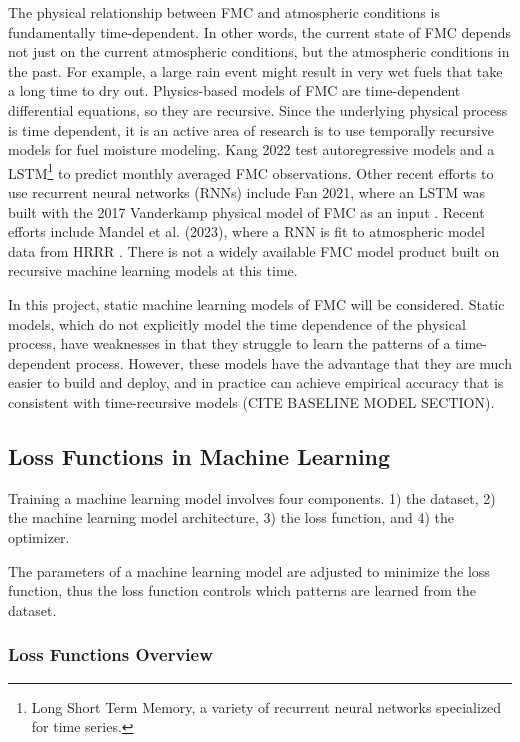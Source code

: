 \documentclass[11pt]{article}%
\begin{document}
The physical relationship between FMC and atmospheric conditions is fundamentally time-dependent. In other words, the current state of FMC depends not just on the current atmospheric conditions, but the atmospheric conditions in the past. For example, a large rain event might result in very wet fuels that take a long time to dry out. Physics-based models of FMC are time-dependent differential equations, so they are recursive. Since the underlying physical process is time dependent, it is an active area of research is to use temporally recursive models for fuel moisture modeling. Kang 2022 test autoregressive models and a LSTM\footnote{Long Short Term Memory, a variety of recurrent neural networks specialized for time series.} to predict monthly averaged FMC observations. \cite{Kang-2022-FMC} Other recent efforts to use recurrent neural networks (RNNs) include Fan 2021, where an LSTM was built with the 2017 Vanderkamp physical model of FMC as an input \cite{Fan-2021-PGD}. Recent efforts include Mandel et al. (2023), where a RNN is fit to atmospheric model data from HRRR \cite{Mandel-2023-BFM}. There is not a widely available FMC model product built on recursive machine learning models at this time.

In this project, static machine learning models of FMC will be considered. Static models, which do not explicitly model the time dependence of the physical process, have weaknesses in that they struggle to learn the patterns of a time-dependent process. However, these models have the advantage that they are much easier to build and deploy, and in practice can achieve empirical accuracy that is consistent with time-recursive models (CITE BASELINE MODEL SECTION).

\subsection{Loss Functions in Machine Learning}

Training a machine learning model involves four components. 1) the dataset, 2) the machine learning model architecture, 3) the loss function, and 4) the optimizer. 

The parameters of a machine learning model are adjusted to minimize the loss function, thus the loss function controls which patterns are learned from the dataset.

\subsubsection{Loss Functions Overview}
\end{document}

